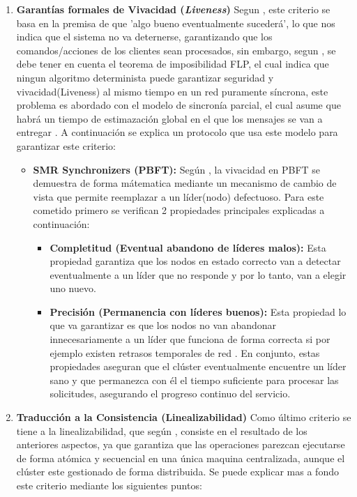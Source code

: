 \documentclass[12pt,letterpaper]{article}
\begin{document}
\begin{enumerate}
\begin{itemize}
        
    \end{itemize}

    \item \textbf{Garantías formales de Vivacidad (\textit{Liveness})}
    Segun \cite{bravo2024}, este criterio se basa en la premisa de que 'algo bueno eventualmente sucederá', lo que nos indica que el sistema no va deternerse, garantizando que los comandos/acciones de los clientes sean procesados, sin embargo, segun \cite{lebow2025}, se debe tener en cuenta el teorema de imposibilidad FLP, el cual indica que ningun algoritmo determinista puede garantizar seguridad y vivacidad(Liveness) al mismo tiempo en un red puramente síncrona, este problema es abordado con el modelo de sincronía parcial, el cual asume que habrá un tiempo de estimazación global en el que los mensajes se van a entregar \cite{bravo2024}. A continuación se explica un protocolo que usa este modelo para garantizar este criterio:

    
    \begin{itemize}
        \item \textbf{SMR Synchronizers (PBFT):} Según \cite{bravo2024}, la vivacidad en PBFT se demuestra de forma mátematica mediante un mecanismo de cambio de vista que permite reemplazar a un líder(nodo) defectuoso. Para este cometido primero se verifican 2 propiedades principales explicadas a continuación:
        

        \begin{itemize}
            \item \textbf{Completitud (Eventual abandono de líderes malos):} Esta propiedad garantiza que los nodos en estado correcto van a detectar eventualmente a un líder que no responde y por lo tanto, van a elegir uno nuevo. \cite{bravo2024} 
                
            \item \textbf{Precisión (Permanencia con líderes buenos):}
            Esta propiedad lo que va garantizar es que los nodos no van abandonar innecesariamente a un líder que funciona de forma correcta si por ejemplo existen retrasos temporales de red \cite{bravo2024}.
             En conjunto, estas propiedades aseguran que el clúster eventualmente encuentre un líder sano y que permanezca con él el tiempo suficiente para procesar las solicitudes, asegurando el progreso continuo del servicio.
        \end{itemize}
    \end{itemize}

    \item \textbf{Traducción a la Consistencia (Linealizabilidad)}
    Como último criterio se tiene a la linealizabilidad, que según \cite{woos2016}, consiste en el resultado de los anteriores aspectos, ya que garantiza que las operaciones parezcan ejecutarse de forma atómica y secuencial en una única maquina centralizada, aunque el clúster este gestionado de forma distribuida. Se puede explicar mas a fondo este criterio mediante los siguientes puntos:


\end{enumerate}
\end{document}
